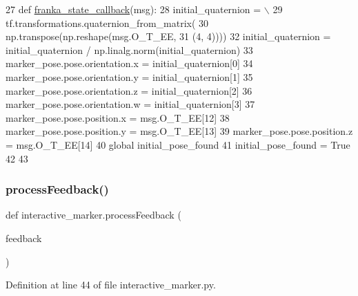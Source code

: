 \begin{DoxyCode}
27 \textcolor{keyword}{def }\hyperlink{namespaceinteractive__marker_a3ca26991be43b2dfab3662fab7d29557}{franka\_state\_callback}(msg):
28     initial\_quaternion = \(\backslash\)
29         tf.transformations.quaternion\_from\_matrix(
30             np.transpose(np.reshape(msg.O\_T\_EE,
31                                     (4, 4))))
32     initial\_quaternion = initial\_quaternion / np.linalg.norm(initial\_quaternion)
33     marker\_pose.pose.orientation.x = initial\_quaternion[0]
34     marker\_pose.pose.orientation.y = initial\_quaternion[1]
35     marker\_pose.pose.orientation.z = initial\_quaternion[2]
36     marker\_pose.pose.orientation.w = initial\_quaternion[3]
37     marker\_pose.pose.position.x = msg.O\_T\_EE[12]
38     marker\_pose.pose.position.y = msg.O\_T\_EE[13]
39     marker\_pose.pose.position.z = msg.O\_T\_EE[14]
40     \textcolor{keyword}{global} initial\_pose\_found
41     initial\_pose\_found = \textcolor{keyword}{True}
42 
43 
\end{DoxyCode}
\mbox{\label{namespaceinteractive__marker_a6d5c00570a7279d0c91ed3fe895d2eb3}} 
\subsubsection{\texorpdfstring{process\+Feedback()}{processFeedback()}}
{\footnotesize\ttfamily def interactive\+\_\+marker.\+process\+Feedback (\begin{DoxyParamCaption}\item[{}]{feedback }\end{DoxyParamCaption})}



Definition at line 44 of file interactive\+\_\+marker.\+py.


